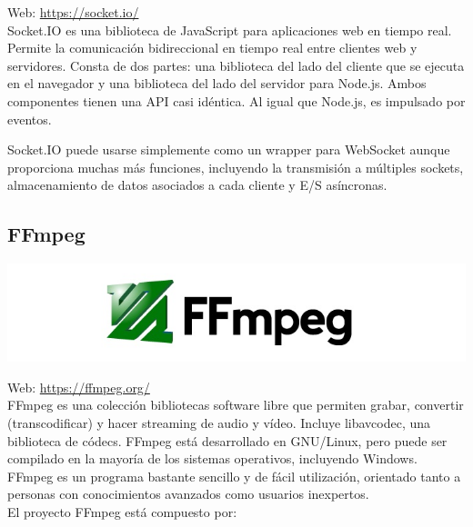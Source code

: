 Web: \url{https://socket.io/}\\

Socket.IO es una biblioteca de JavaScript para aplicaciones web en tiempo real. Permite la comunicación bidireccional en tiempo real entre clientes web y servidores. Consta de dos partes: una biblioteca del lado del cliente
que se ejecuta en el navegador y una biblioteca del lado del servidor para Node.js. Ambos componentes tienen una API casi idéntica. Al igual que Node.js, es impulsado por eventos.

Socket.IO puede usarse simplemente como un wrapper para WebSocket aunque proporciona muchas más funciones, incluyendo la transmisión a múltiples sockets, almacenamiento de datos asociados a cada cliente y E/S asíncronas.


\subsection{ FFmpeg }


\begin{center}
\includegraphics[scale=0.75]{imagenes/Ffmpeg-logo.jpg}
\end{center}

Web: \url{https://ffmpeg.org/}\\

FFmpeg es una colección bibliotecas software libre que permiten grabar, convertir (transcodificar) y hacer streaming de audio y vídeo. Incluye libavcodec, una biblioteca de códecs. FFmpeg está desarrollado en GNU/Linux, pero puede ser compilado
en la mayoría de los sistemas operativos, incluyendo Windows.\\

FFmpeg es un programa bastante sencillo y de fácil utilización, orientado tanto a personas con conocimientos avanzados como usuarios inexpertos. \\

El proyecto FFmpeg está compuesto por:\\

